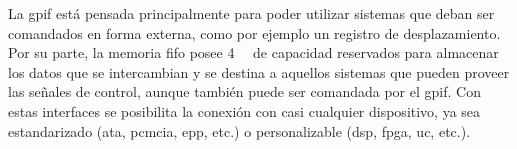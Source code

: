 La \acrshort{gpif} está pensada principalmente para poder utilizar sistemas que deban ser comandados en forma externa, como por ejemplo un registro de desplazamiento. Por su parte, la memoria \acrshort{fifo} posee \SI{4}{\kilo\byte} de capacidad reservados para almacenar los datos que se intercambian y se destina a aquellos sistemas que pueden proveer las señales de control, aunque también puede ser comandada por el \acrshort{gpif}. Con estas interfaces se posibilita la conexión con casi cualquier dispositivo, ya sea estandarizado (\acrshort{ata}, \acrshort{pcmcia}, \acrshort{epp}, etc.) o personalizable (\acrshort{dsp}, \acrshort{fpga}, \acrshort{uc}, etc.).



 

